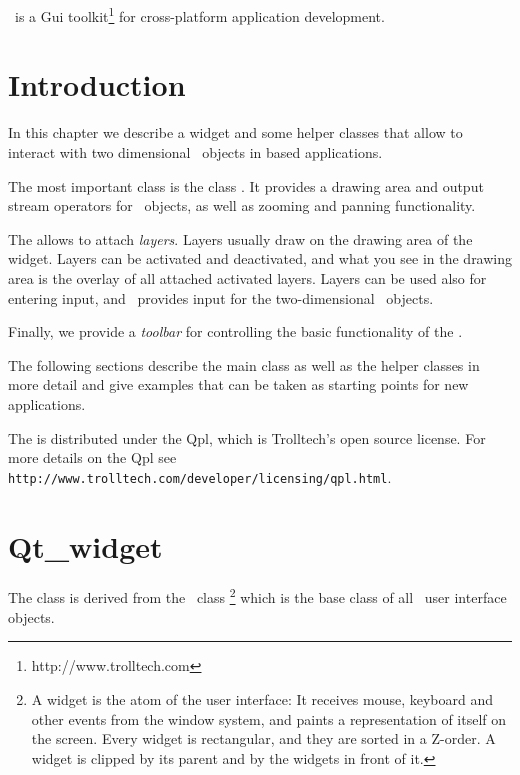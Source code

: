 \qt\ is a {\sc Gui} toolkit\footnote{http://www.trolltech.com} for
cross-platform application development. 

\section{Introduction}

In this chapter we describe a widget and some helper classes that
allow to interact with two dimensional \cgal\ objects in \qt\/ based applications.

The most important class is the class . It provides
a drawing area and output stream operators for \cgal\ objects, as well
as zooming and panning functionality.

The  allows to attach {\em layers}. Layers usually
draw on the drawing area of the widget. Layers can be activated and
deactivated, and what you see in the drawing area is the overlay of
all attached activated layers. Layers can be used also for entering
input, and \cgal\ provides input  for the two-dimensional
\cgal\ objects.

Finally, we provide a {\em toolbar} for controlling the basic functionality
of the .

The following sections describe the main class as well as the helper classes
in more detail and give examples that can be taken as starting points for
new applications.


 The  is distributed under
the {\sc Qpl}, which is Trolltech's open source license. For more details
on the {\sc Qpl} see \verb+http://www.trolltech.com/developer/licensing/qpl.html+.

\section{Qt\_widget}
\label{Qt_widget}

The class  is derived from the \qt\ class %
\footnote{A widget is the atom of the user interface: It receives mouse, keyboard and other 
events from the window system, and paints a representation of itself on the 
screen. Every widget is rectangular, and they are sorted in a Z-order. A 
widget is clipped by its parent and by the widgets in front of it.} 
which is the base class of all \qt\ user interface objects. 


